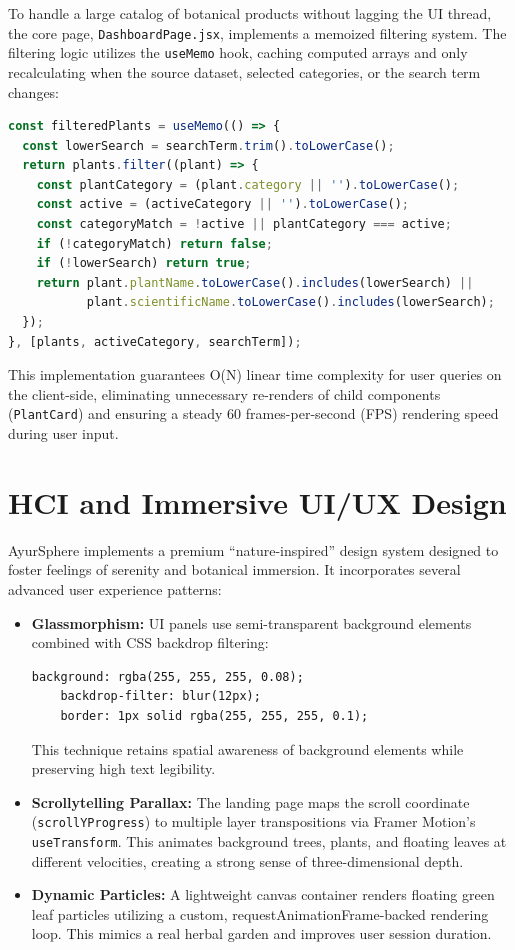 \documentclass[conference]{IEEEtran}
\begin{document}
To handle a large catalog of botanical products without lagging the UI thread, the core page, \texttt{DashboardPage.jsx}, implements a memoized filtering system. The filtering logic utilizes the \texttt{useMemo} hook, caching computed arrays and only recalculating when the source dataset, selected categories, or the search term changes:
\begin{lstlisting}[language=JavaScript]
const filteredPlants = useMemo(() => {
  const lowerSearch = searchTerm.trim().toLowerCase();
  return plants.filter((plant) => {
    const plantCategory = (plant.category || '').toLowerCase();
    const active = (activeCategory || '').toLowerCase();
    const categoryMatch = !active || plantCategory === active;
    if (!categoryMatch) return false;
    if (!lowerSearch) return true;
    return plant.plantName.toLowerCase().includes(lowerSearch) || 
           plant.scientificName.toLowerCase().includes(lowerSearch);
  });
}, [plants, activeCategory, searchTerm]);
\end{lstlisting}
This implementation guarantees O(N) linear time complexity for user queries on the client-side, eliminating unnecessary re-renders of child components (\texttt{PlantCard}) and ensuring a steady 60 frames-per-second (FPS) rendering speed during user input.

\section{HCI and Immersive UI/UX Design}
AyurSphere implements a premium ``nature-inspired'' design system designed to foster feelings of serenity and botanical immersion. It incorporates several advanced user experience patterns:
\begin{itemize}
    \item \textbf{Glassmorphism:} UI panels use semi-transparent background elements combined with CSS backdrop filtering:
    \begin{lstlisting}[language=HTML]
    background: rgba(255, 255, 255, 0.08);
    backdrop-filter: blur(12px);
    border: 1px solid rgba(255, 255, 255, 0.1);
    \end{lstlisting}
    This technique retains spatial awareness of background elements while preserving high text legibility.
    \item \textbf{Scrollytelling Parallax:} The landing page maps the scroll coordinate (\texttt{scrollYProgress}) to multiple layer transpositions via Framer Motion's \texttt{useTransform}. This animates background trees, plants, and floating leaves at different velocities, creating a strong sense of three-dimensional depth.
    \item \textbf{Dynamic Particles:} A lightweight canvas container renders floating green leaf particles utilizing a custom, requestAnimationFrame-backed rendering loop. This mimics a real herbal garden and improves user session duration.
\end{itemize}
\end{document}
